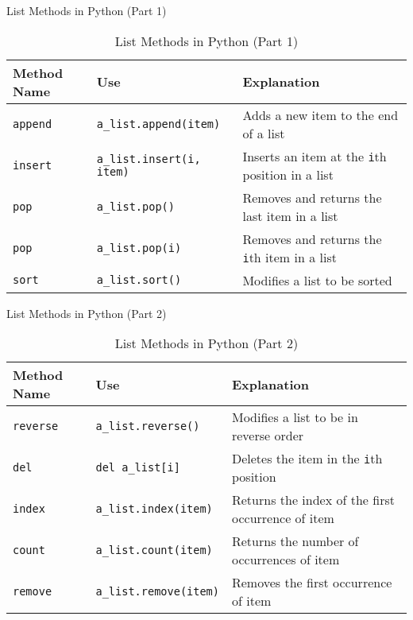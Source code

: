 \begin{frame}{List Methods in Python (Part 1)}
    \begin{table}[]
        \centering
        \begin{tabular}{|l|l|p{4cm}|}
            \hline
            \textbf{Method Name} & \textbf{Use} & \textbf{Explanation} \\ \hline
            \texttt{append} & \texttt{a\_list.append(item)} & Adds a new item to the end of a list \\ \hline
            \texttt{insert} & \texttt{a\_list.insert(i, item)} & Inserts an item at the \texttt{i}th position in a list \\ \hline
            \texttt{pop} & \texttt{a\_list.pop()} & Removes and returns the last item in a list \\ \hline
            \texttt{pop} & \texttt{a\_list.pop(i)} & Removes and returns the \texttt{i}th item in a list \\ \hline
            \texttt{sort} & \texttt{a\_list.sort()} & Modifies a list to be sorted \\ \hline
        \end{tabular}
        \caption{List Methods in Python (Part 1)}
    \end{table}
\end{frame}

\begin{frame}{List Methods in Python (Part 2)}
    \begin{table}[]
        \centering
        \begin{tabular}{|l|l|p{4cm}|}
            \hline
            \textbf{Method Name} & \textbf{Use} & \textbf{Explanation} \\ \hline
            \texttt{reverse} & \texttt{a\_list.reverse()} & Modifies a list to be in reverse order \\ \hline
            \texttt{del} & \texttt{del a\_list[i]} & Deletes the item in the \texttt{i}th position \\ \hline
            \texttt{index} & \texttt{a\_list.index(item)} & Returns the index of the first occurrence of item \\ \hline
            \texttt{count} & \texttt{a\_list.count(item)} & Returns the number of occurrences of item \\ \hline
            \texttt{remove} & \texttt{a\_list.remove(item)} & Removes the first occurrence of item \\ \hline
        \end{tabular}
        \caption{List Methods in Python (Part 2)}
    \end{table}
\end{frame}

